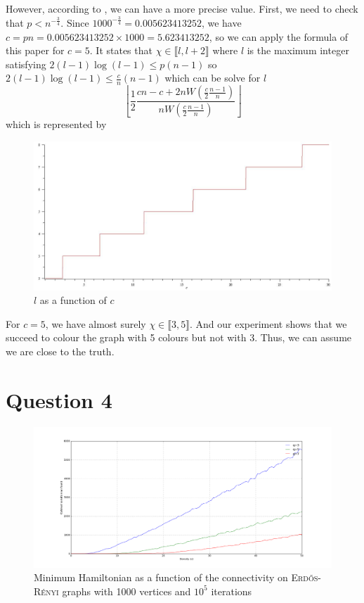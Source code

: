 \documentclass[a4paper, 11pt]{article}
\newcommand{\floor}[1]{{\left\lfloor #1 \right\rfloor}}
\begin{document}
However, according to \cite{coja2008chromatic}, we can have a more precise value. First, we need to check that $p < n^{-\frac{3}{4}}$. Since $1000^{-\frac{3}{4}} = 0.005623413252$, we have $c = pn = 0.005623413252 \times 1000 = 5.623413252$, so we can apply the formula of this paper for $c = 5$. It states that $\chi \in \llbracket l, l+2\rrbracket$ where $l$ is the maximum integer satisfying $2(l-1)\log(l-1)\leqslant p(n-1)$ so $2(l-1)\log(l-1)\leqslant \frac{c}{n}(n-1)$ which can be solve for $l$ 
\[
    \floor{\frac{1}{2}\frac{cn-c+2n W\left(\frac{c}{2}\frac{n-1}{n}\right)}{n W\left(\frac{c}{2}\frac{n-1}{n}\right)}}
\]
which is represented by
\begin{figure}[!ht]
    \centering
    \includegraphics[width=\textwidth]{figures/chi}
    \caption{$l$ as a function of $c$}\label{chi}
\end{figure}
For $c=5$, we have almost surely $\chi \in \llbracket 3, 5\rrbracket$. And our experiment shows that we succeed to colour the graph with 5 colours but not with 3. Thus, we can assume we are close to the truth.

\FloatBarrier

\section{Question 4}

\begin{figure}[!ht]
    \centering
    \includegraphics[width=\textwidth]{figures/q4}
    \caption{Minimum Hamiltonian as a function of the connectivity on \textsc{Erd\H{o}s-Rényi} graphs with 1000 vertices and $10^5$ iterations}
\end{figure}
\end{document}
